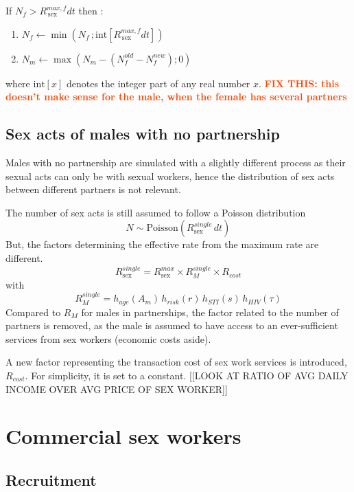 \documentclass[11pt, onecolumn]{article}
\newcommand{\warning}[1]{\textbf{\textcolor{OrangeRed}{#1}}}
\begin{document}
If $N_f>R_{\mathrm{\,sex}}^{max,f}dt$ then :
\begin{enumerate}
\item $N_f \leftarrow \min\left(N_f \,; \text{int}[R_{\mathrm{\,sex}}^{max,f}dt]\right)$
\item $N_m \leftarrow \max\left(N_m - (N_f^{old}-N_f^{new}) ; 0\right)$
\end{enumerate}
where $ \text{int}[x]$ denotes the integer part of any real number $x$.
\warning{FIX THIS: this doesn't make sense for the male, when the female has several partners}


\subsection{Sex acts of males with no partnership}

Males with no partnership are simulated with a slightly different process as their sexual acts can only be with sexual workers, hence the distribution of sex acts between different partners is not relevant.

The number of sex acts is still assumed to follow a Poisson distribution
$$N\sim \mathrm{Poisson}(R_{\mathrm{sex}}^{single}\, dt)$$
But, the factors determining the effective rate from the maximum rate are different.
$$R_{\mathrm{sex}}^{single} = R_{\mathrm{sex}}^{max} \times R_{M}^{single} \times R_{cost} $$
with 
$$R_M^{single}= h_{age}(A_m)  \, h_{risk}(r) \,h_{STI}(s) \,h_{HIV}(\tau)  $$
Compared to $R_M$ for males in partnerships, the factor related to the number of partners is removed, as the male is assumed to have access to an ever-sufficient services from sex workers (economic costs aside).

A new factor representing the transaction cost of sex work services is introduced, $R_{cost}$. For simplicity, it is set to a constant. [[LOOK AT RATIO OF AVG DAILY INCOME OVER AVG PRICE OF SEX WORKER]]




\section{Commercial sex workers}

\subsection{Recruitment}
\end{document}
